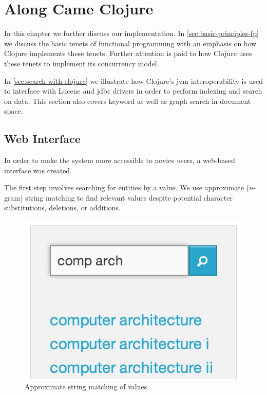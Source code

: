 \chapter{Along Came Clojure}
\label{chap:along-came-clojure}
	In this chapter we further discuss our implementation.  In \cref{sec:basic-principles-fp} we discuss the basic tenets of functional programming with an emphasis on how Clojure implements these tenets.  Further attention is paid to how Clojure uses these tenets to implement its concurrency model.
	
	In \cref{sec:search-with-clojure} we illustrate how Clojure's \gls{jvm} interoperability is used to interface with Lucene and \gls{jdbc} drivers in order to perform indexing and search on data.  This section also covers keyword as well as graph search in document space.
	
	
	
	
	\section{Web Interface}
	\label{sec:web-interface}
		In order to make the system more accessible to novice users, a web-based interface was created.
		
		The first step involves searching for entities by a value.  We use approximate (\(n\)-gram) string matching to find relevant values despite potential character substitutions, deletions, or additions.
		
		\begin{figure}[H]
			\centering
			\includegraphics[scale=0.5]{figures/images/step-1}
			
			\caption{Approximate string matching of values}
			\label{fig:webui-step-1}
		\end{figure}
		
